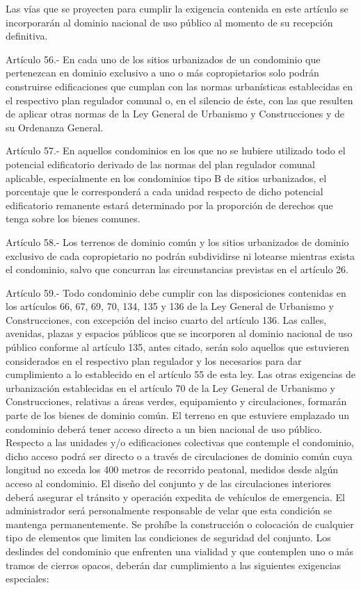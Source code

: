     Las vías que se proyecten para cumplir la exigencia contenida en este artículo se incorporarán al dominio nacional de uso público al momento de su recepción definitiva.
     
    Artículo 56.- En cada uno de los sitios urbanizados de un condominio que pertenezcan en dominio exclusivo a uno o más copropietarios solo podrán construirse edificaciones que cumplan con las normas urbanísticas establecidas en el respectivo plan regulador comunal o, en el silencio de éste, con las que resulten de aplicar otras normas de la Ley General de Urbanismo y Construcciones y de su Ordenanza General.
     
    Artículo 57.- En aquellos condominios en los que no se hubiere utilizado todo el potencial edificatorio derivado de las normas del plan regulador comunal aplicable, especialmente en los condominios tipo B de sitios urbanizados, el porcentaje que le corresponderá a cada unidad respecto de dicho potencial edificatorio remanente estará determinado por la proporción de derechos que tenga sobre los bienes comunes.
   
    Artículo 58.- Los terrenos de dominio común y los sitios urbanizados de dominio exclusivo de cada copropietario no podrán subdividirse ni lotearse mientras exista el condominio, salvo que concurran las circunstancias previstas en el artículo 26.
     
    Artículo 59.- Todo condominio debe cumplir con las disposiciones contenidas en los artículos 66, 67, 69, 70, 134, 135 y 136 de la Ley General de Urbanismo y Construcciones, con excepción del inciso cuarto del artículo 136. Las calles, avenidas, plazas y espacios públicos que se incorporen al dominio nacional de uso público conforme al artículo 135, antes citado, serán solo aquellos que estuvieren considerados en el respectivo plan regulador y los necesarios para dar cumplimiento a lo establecido en el artículo 55 de esta ley. Las otras exigencias de urbanización establecidas en el artículo 70 de la Ley General de Urbanismo y Construcciones, relativas a áreas verdes, equipamiento y circulaciones, formarán parte de los bienes de dominio común.
    El terreno en que estuviere emplazado un condominio deberá tener acceso directo a un bien nacional de uso público. Respecto a las unidades y/o edificaciones colectivas que contemple el condominio, dicho acceso podrá ser directo o a través de circulaciones de dominio común cuya longitud no exceda los 400 metros de recorrido peatonal, medidos desde algún acceso al condominio.
    El diseño del conjunto y de las circulaciones interiores deberá asegurar el tránsito y operación expedita de vehículos de emergencia. El administrador será personalmente responsable de velar que esta condición se mantenga permanentemente. Se prohíbe la construcción o colocación de cualquier tipo de elementos que limiten las condiciones de seguridad del conjunto.
    Los deslindes del condominio que enfrenten una vialidad y que contemplen uno o más tramos de cierros opacos, deberán dar cumplimiento a las siguientes exigencias especiales:
     
